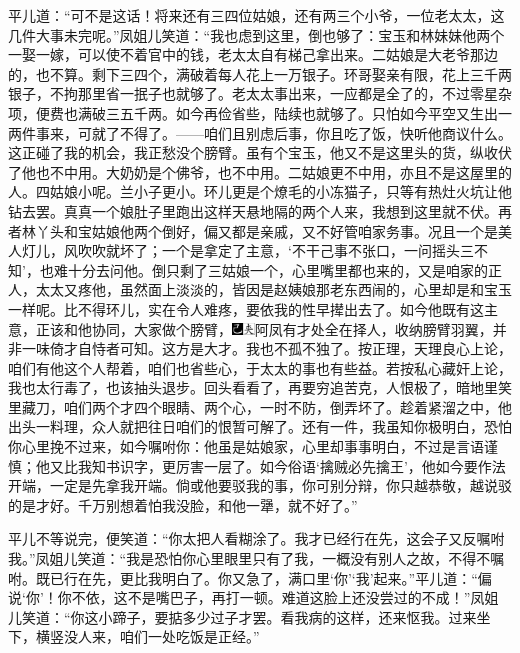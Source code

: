 平儿道：“可不是这话！将来还有三四位姑娘，还有两三个小爷，一位老太太，这几件大事未完呢。”凤姐儿笑道：“我也虑到这里，倒也够了：宝玉和林妹妹他两个一娶一嫁，可以使不着官中的钱，老太太自有梯己拿出来。二姑娘是大老爷那边的，也不算。剩下三四个，满破着每人花上一万银子。环哥娶亲有限，花上三千两银子，不拘那里省一抿子也就够了。老太太事出来，一应都是全了的，不过零星杂项，便费也满破三五千两。如今再俭省些，陆续也就够了。只怕如今平空又生出一两件事来，可就了不得了。------咱们且别虑后事，你且吃了饭，快听他商议什么。这正碰了我的机会，我正愁没个膀臂。虽有个宝玉，他又不是这里头的货，纵收伏了他也不中用。大奶奶是个佛爷，也不中用。二姑娘更不中用，亦且不是这屋里的人。四姑娘小呢。兰小子更小。环儿更是个燎毛的小冻猫子，只等有热灶火坑让他钻去罢。真真一个娘肚子里跑出这样天悬地隔的两个人来，我想到这里就不伏。再者林丫头和宝姑娘他两个倒好，偏又都是亲戚，又不好管咱家务事。况且一个是美人灯儿，风吹吹就坏了；一个是拿定了主意，‘不干己事不张口，一问摇头三不知’，也难十分去问他。倒只剩了三姑娘一个，心里嘴里都也来的，又是咱家的正人，太太又疼他，虽然面上淡淡的，皆因是赵姨娘那老东西闹的，心里却是和宝玉一样呢。比不得环儿，实在令人难疼，要依我的性早撵出去了。如今他既有这主意，正该和他协同，大家做个膀臂，{\includegraphics[width=3mm]{../Images/00003}\includegraphics[width=3mm]{../Images/00012}\footnotesize \kaishu 阿凤有才处全在择人，收纳膀臂羽翼，并非一味倚才自恃者可知。这方是大才。}我也不孤不独了。按正理，天理良心上论，咱们有他这个人帮着，咱们也省些心，于太太的事也有些益。若按私心藏奸上论，我也太行毒了，也该抽头退步。回头看看了，再要穷追苦克，人恨极了，暗地里笑里藏刀，咱们两个才四个眼睛、两个心，一时不防，倒弄坏了。趁着紧溜之中，他出头一料理，众人就把往日咱们的恨暂可解了。还有一件，我虽知你极明白，恐怕你心里挽不过来，如今嘱咐你：他虽是姑娘家，心里却事事明白，不过是言语谨慎；他又比我知书识字，更厉害一层了。如今俗语‘擒贼必先擒王’，他如今要作法开端，一定是先拿我开端。倘或他要驳我的事，你可别分辩，你只越恭敬，越说驳的是才好。千万别想着怕我没脸，和他一犟，就不好了。”

平儿不等说完，便笑道：“你太把人看糊涂了。我才已经行在先，这会子又反嘱咐我。”凤姐儿笑道：“我是恐怕你心里眼里只有了我，一概没有别人之故，不得不嘱咐。既已行在先，更比我明白了。你又急了，满口里‘你’‘我’起来。”平儿道：“偏说‘你’！你不依，这不是嘴巴子，再打一顿。难道这脸上还没尝过的不成！”凤姐儿笑道：“你这小蹄子，要掂多少过子才罢。看我病的这样，还来怄我。过来坐下，横竖没人来，咱们一处吃饭是正经。”

